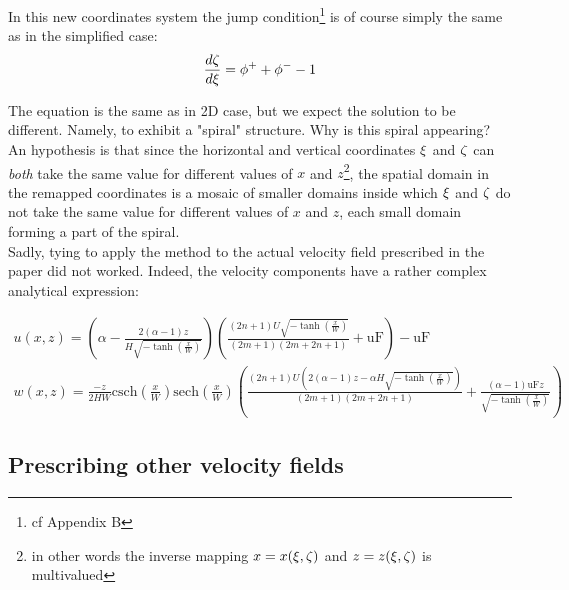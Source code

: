 In this new coordinates system the jump condition\footnote{cf Appendix B} is of course simply the same as in the simplified case:
\begin{equation}
	\frac{d {\zeta}}{d {\xi}} = \phi^+ + \phi^-  - 1
\end{equation}

The equation is the same as in 2D case, but we expect the solution to be different. Namely, to exhibit a "spiral" structure. 
Why is this spiral appearing? An hypothesis is that since the horizontal and vertical coordinates $\xi$ and $\zeta$ can \textit{both} take the same value for different values of $x$ and $z$\footnote{in other words the inverse mapping $x = x(\xi, \zeta)$ and $z = z(\xi,\zeta)$ is multivalued}, the spatial domain in the remapped coordinates is a mosaic of smaller domains inside which $\xi$ and $\zeta$ do not take the same value for different values of $x$ and $z$, each small domain forming a part of the spiral. \\

Sadly, tying to apply the method to the actual velocity field prescribed in the paper did not worked. 
Indeed, the velocity components have a rather complex analytical expression:

\begin{align}
	u(x, z) = 
	\left(\alpha -\frac{2 (\alpha -1) z}{H \sqrt{-\tanh \left(\frac{x}{W}\right)}}\right) \left(\frac{(2 n+1) U \sqrt{-\tanh \left(\frac{x}{W}\right)}}{(2 m+1) (2 m+2 n+1)}+\text{uF}\right)-\text{uF} \\
	w(x,z) = \frac{-z}{2 H W}
	\text{csch}\left(\frac{x}{W}\right) \text{sech}\left(\frac{x}{W}\right) \left(\frac{(2 n+1) U \left(2 (\alpha -1) z-\alpha  H \sqrt{-\tanh \left(\frac{x}{W}\right)}\right)}{(2 m+1) (2 m+2 n+1)}+\frac{(\alpha -1) \text{uF} z}{\sqrt{-\tanh \left(\frac{x}{W}\right)}}\right)
\end{align}

\subsection{Prescribing other velocity fields}


